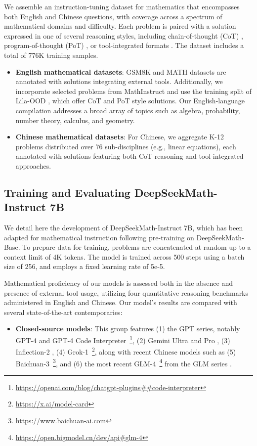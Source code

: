 We assemble an instruction-tuning dataset for mathematics that encompasses both English and Chinese questions, with coverage across a spectrum of mathematical domains and difficulty. Each problem is paired with a solution expressed in one of several reasoning styles, including chain-of-thought (CoT) \citep{cot}, program-of-thought (PoT) \citep{pot,pal}, or tool-integrated formats \citep{tora}. The dataset includes a total of 776K training samples.

\begin{itemize}[topsep=0pt]
    \item \textbf{English mathematical datasets}: GSM8K and MATH datasets are annotated with solutions integrating external tools. Additionally, we incorporate selected problems from MathInstruct \citep{MathInstruct} and use the training split of Lila-OOD \citep{lila}, which offer CoT and PoT style solutions. Our English-language compilation addresses a broad array of topics such as algebra, probability, number theory, calculus, and geometry.
    \item \textbf{Chinese mathematical datasets}: For Chinese, we aggregate K-12 problems distributed over 76 sub-disciplines (e.g., linear equations), each annotated with solutions featuring both CoT reasoning and tool-integrated approaches.
\end{itemize}

\subsection{Training and Evaluating DeepSeekMath-Instruct 7B}

We detail here the development of DeepSeekMath-Instruct 7B, which has been adapted for mathematical instruction following pre-training on DeepSeekMath-Base. To prepare data for training, problems are concatenated at random up to a context limit of 4K tokens. The model is trained across 500 steps using a batch size of 256, and employs a fixed learning rate of 5e-5.

Mathematical proficiency of our models is assessed both in the absence and presence of external tool usage, utilizing four quantitative reasoning benchmarks administered in English and Chinese. Our model’s results are compared with several state-of-the-art contemporaries:

\begin{itemize}[topsep=0pt]
    \item \textbf{Closed-source models}: This group features (1) the GPT series, notably GPT-4 \citep{gpt4} and GPT-4 Code Interpreter~\footnote{\url{https://openai.com/blog/chatgpt-plugins\#\#code-interpreter}}, (2) Gemini Ultra and Pro \citep{gemini}, (3) Inflection-2 \citep{inflection-2}, (4) Grok-1~\footnote{\url{https://x.ai/model-card}}, along with recent Chinese models such as (5) Baichuan-3~\footnote{\url{https://www.baichuan-ai.com}}, and (6) the most recent GLM-4~\footnote{\url{https://open.bigmodel.cn/dev/api\#glm-4}} from the GLM series \citep{glm}.
\end{itemize}

